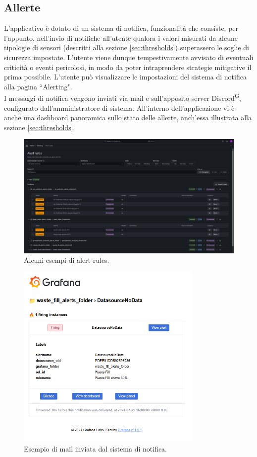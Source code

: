 \documentclass[8pt]{article}
\newcommand{\glossterm}[1]{#1\textsuperscript{G}} %
\begin{document}
\subsection{Allerte} \label{sec:alert}
L'applicativo è dotato di un sistema di notifica, funzionalità che consiste, per l'appunto, nell'invio di notifiche all'utente qualora i valori misurati da alcune tipologie di sensori (descritti alla sezione \ref{sec:thresholds}) superassero le soglie di sicurezza impostate. L'utente viene dunque tempestivamente avvisato di eventuali criticità o eventi pericolosi, in modo da poter intraprendere strategie mitigative il prima possibile. L'utente può visualizzare le impostazioni del sistema di notifica alla pagina ``Alerting". \\ I messaggi di notifica vengono inviati via mail e sull'apposito server \glossterm{Discord}, configurato dall'amministratore di sistema. All'interno dell'applicazione vi è anche una dashboard panoramica sullo stato delle allerte, anch'essa illustrata alla sezione \ref{sec:thresholds}.
\begin{figure}[H]
    \centering
    \includegraphics[width=15cm]{images_mu/alerting.png}
    \caption{Alcuni esempi di alert rules.}
    \label{fig:Alcuni esempi di alert rules}
\end{figure}
\begin{figure}[H]
    \centering
    \includegraphics[width=9cm]{images_mu/mail.png}
    \caption{Esempio di mail inviata dal sistema di notifica.}
    \label{fig:Esempio di mail inviata dal sistema di notifica}
\end{figure}
\end{document}
